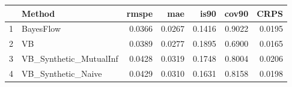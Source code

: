 \documentclass[12pt]{article}
\begin{document}
\thispagestyle{empty}
\begin{table}[ht]
\centering
\begin{tabular}{rlrrrrr}
  \hline
 & Method & rmspe & mae & is90 & cov90 & CRPS \\ 
  \hline
1 & BayesFlow & 0.0366 & 0.0267 & 0.1416 & 0.9022 & 0.0195 \\ 
  2 & VB & 0.0389 & 0.0277 & 0.1895 & 0.6900 & 0.0165 \\ 
  3 & VB\_Synthetic\_MutualInf & 0.0428 & 0.0319 & 0.1748 & 0.8004 & 0.0206 \\ 
  4 & VB\_Synthetic\_Naive & 0.0429 & 0.0310 & 0.1631 & 0.8158 & 0.0198 \\ 
   \hline
\end{tabular}
\end{table}
\end{document}

